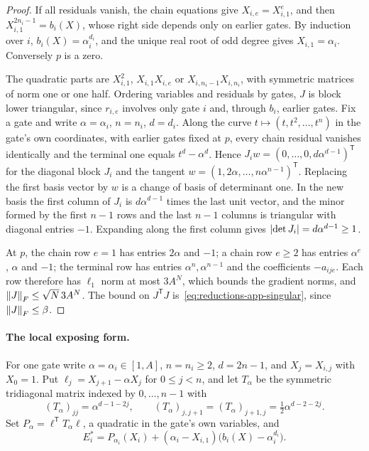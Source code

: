 \begin{proof}
If all residuals vanish, the chain equations give $X_{i,e}=X_{i,1}^e$, and then
$X_{i,1}^{2n_i-1}=b_i(X)$, whose right side depends only on earlier gates. By
induction over $i$, $b_i(X)=\alpha_i^{d_i}$, and the unique real root of odd
degree gives $X_{i,1}=\alpha_i$. Conversely $p$ is a zero.

The quadratic parts are $X_{i,1}^2$, $X_{i,1}X_{i,e}$ or
$X_{i,n_i-1}X_{i,n_i}$, with symmetric matrices of norm one or one half. Ordering
variables and residuals by gates, $J$ is block lower triangular, since $r_{i,e}$
involves only gate $i$ and, through $b_i$, earlier gates. Fix a gate and write
$\alpha=\alpha_i$, $n=n_i$, $d=d_i$. Along the curve $t\mapsto(t,t^2,\ldots,t^n)$
in the gate's own coordinates, with earlier gates fixed at $p$, every chain
residual vanishes identically and the terminal one equals $t^d-\alpha^d$. Hence
$J_iw=(0,\ldots,0,d\alpha^{d-1})^{\mathsf T}$ for the diagonal block $J_i$ and the
tangent $w=(1,2\alpha,\ldots,n\alpha^{n-1})^{\mathsf T}$. Replacing the first
basis vector by $w$ is a change of basis of determinant one. In the new basis
the first column of $J_i$ is $d\alpha^{d-1}$ times the last unit vector, and the
minor formed by the first $n-1$ rows and the last $n-1$ columns is triangular
with diagonal entries $-1$. Expanding along the first column gives
$\left\lvert\det J_i\right\rvert=d\alpha^{d-1}\ge1$.

At $p$, the chain row $e=1$ has entries $2\alpha$ and $-1$; a chain row $e\ge2$
has entries $\alpha^e$, $\alpha$ and $-1$; the terminal row has entries
$\alpha^{n},\alpha^{n-1}$ and the coefficients $-a_{ije}$. Each row therefore has
$\ell_1$ norm at most $3A^N$, which bounds the gradient norms, and
$\left\lVert J\right\rVert_F\le\sqrt N\,3A^N$. The bound on $J^{\mathsf T}J$
is~\eqref{eq:reductions-app-singular}, since $\left\lVert J\right\rVert_F\le\beta$.
\end{proof}

\paragraph{The local exposing form.}
For one gate write $\alpha=\alpha_i\in[1,A]$, $n=n_i\ge2$, $d=2n-1$, and
$X_j=X_{i,j}$ with $X_0=1$. Put $\ell_j=X_{j+1}-\alpha X_j$ for $0\le j<n$, and
let $T_\alpha$ be the symmetric tridiagonal matrix indexed by $0,\ldots,n-1$
with
\begin{equation}
 (T_\alpha)_{jj}=\alpha^{d-1-2j},\qquad
 (T_\alpha)_{j,j+1}=(T_\alpha)_{j+1,j}=\tfrac12\alpha^{d-2-2j}.
 \label{eq:reductions-T-alpha}
\end{equation}
Set $P_\alpha=\ell^{\mathsf T}T_\alpha\ell$, a quadratic in the gate's own
variables, and
\[
 E_i^*=P_{\alpha_i}(X_i)+(\alpha_i-X_{i,1})\bigl(b_i(X)-\alpha_i^{d_i}\bigr).
\]

